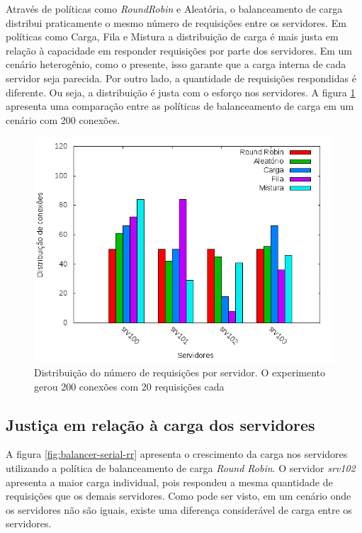 Através de políticas como \emph{RoundRobin} e Aleatória, o balanceamento de 
carga distribui praticamente o mesmo número de requisições entre
os servidores.
Em políticas como Carga, Fila e Mistura a distribuição de carga é mais justa
em relação à capacidade em responder requisições por parte dos servidores.
Em um cenário heterogênio, como o presente, isso garante que a carga interna
de cada servidor seja parecida.
Por outro lado, a quantidade de requisições respondidas é diferente.
Ou seja, a distribuição é justa com o esforço nos servidores.
A figura \ref{fig:balancer-distribution} apresenta uma comparação entre as 
políticas de balanceamento de carga em um cenário com 200 conexões.

\begin{figure}[htb!]
    \centering
    \includegraphics[scale=0.7]{img/balancer-distribution.png}
    \caption{Distribuição do número de requisições por servidor. O experimento
    gerou 200 conexões com 20 requisições cada}
    \label{fig:balancer-distribution}
\end{figure}

\subsection{Justiça em relação à carga dos servidores}

A figura \ref{fig:balancer-serial-rr} apresenta o crescimento da carga nos 
servidores utilizando a política de balanceamento de carga \emph{Round Robin}.
O servidor \emph{srv102} apresenta a maior carga individual, pois respondeu
a mesma quantidade de requisições que os demais servidores.
Como pode ser visto, em um cenário onde os servidores não são iguais, existe
uma diferença considerável de carga entre os servidores.


